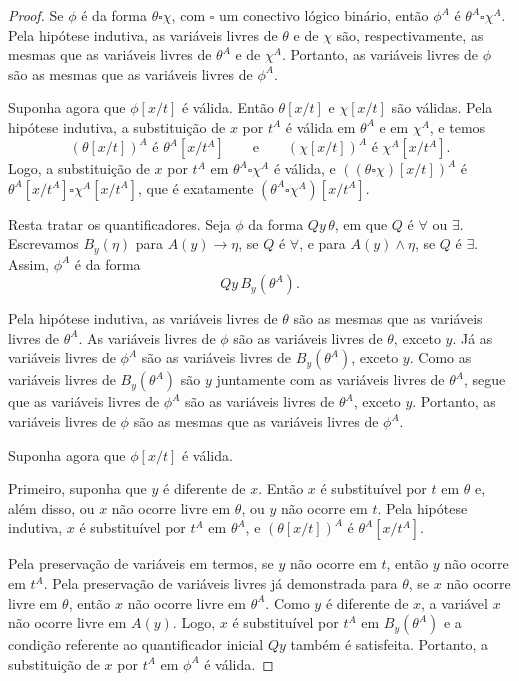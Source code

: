 \begin{proof}
    Se $\phi$ é da forma $\theta\square\chi$, com $\square$ um conectivo lógico binário, então $\phi^A$ é $\theta^A\square\chi^A$.
    Pela hipótese indutiva, as variáveis livres de $\theta$ e de $\chi$ são, respectivamente, as mesmas que as variáveis livres de $\theta^A$ e de $\chi^A$.
    Portanto, as variáveis livres de $\phi$ são as mesmas que as variáveis livres de $\phi^A$.

    Suponha agora que $\phi[x/t]$ é válida.
    Então $\theta[x/t]$ e $\chi[x/t]$ são válidas.
    Pela hipótese indutiva, a substituição de $x$ por $t^A$ é válida em $\theta^A$ e em $\chi^A$, e temos
    \[
        (\theta[x/t])^A \text{ é } \theta^A[x/t^A]
        \qquad\text{e}\qquad
        (\chi[x/t])^A \text{ é } \chi^A[x/t^A].
    \]
    Logo, a substituição de $x$ por $t^A$ em $\theta^A\square\chi^A$ é válida, e $((\theta\square\chi)[x/t])^A$
    é $\theta^A[x/t^A]\square\chi^A[x/t^A]$, que é exatamente $(\theta^A\square\chi^A)[x/t^A]$.

    Resta tratar os quantificadores.
    Seja $\phi$ da forma $Qy\,\theta$, em que $Q$ é $\forall$ ou $\exists$.
    Escrevamos $B_y(\eta)$ para $A(y)\to\eta$, se $Q$ é $\forall$, e para $A(y)\wedge\eta$, se $Q$ é $\exists$.
    Assim, $\phi^A$ é da forma
    \[
        Qy\,B_y(\theta^A).
    \]

    Pela hipótese indutiva, as variáveis livres de $\theta$ são as mesmas que as variáveis livres de $\theta^A$.
    As variáveis livres de $\phi$ são as variáveis livres de $\theta$, exceto $y$.
    Já as variáveis livres de $\phi^A$ são as variáveis livres de $B_y(\theta^A)$, exceto $y$.
    Como as variáveis livres de $B_y(\theta^A)$ são $y$ juntamente com as variáveis livres de $\theta^A$, segue que as variáveis livres de $\phi^A$ são as variáveis livres de $\theta^A$, exceto $y$.
    Portanto, as variáveis livres de $\phi$ são as mesmas que as variáveis livres de $\phi^A$.

    Suponha agora que $\phi[x/t]$ é válida.

    Primeiro, suponha que $y$ é diferente de $x$.
    Então $x$ é substituível por $t$ em $\theta$ e, além disso, ou $x$ não ocorre livre em $\theta$, ou $y$ não ocorre em $t$.
    Pela hipótese indutiva, $x$ é substituível por $t^A$ em $\theta^A$, e $(\theta[x/t])^A$ é $\theta^A[x/t^A]$.

    Pela preservação de variáveis em termos, se $y$ não ocorre em $t$, então $y$ não ocorre em $t^A$.
    Pela preservação de variáveis livres já demonstrada para $\theta$, se $x$ não ocorre livre em $\theta$, então $x$ não ocorre livre em $\theta^A$.
    Como $y$ é diferente de $x$, a variável $x$ não ocorre livre em $A(y)$.
    Logo, $x$ é substituível por $t^A$ em $B_y(\theta^A)$ e a condição referente ao quantificador inicial $Qy$ também é satisfeita.
    Portanto, a substituição de $x$ por $t^A$ em $\phi^A$ é válida.


\end{proof}
